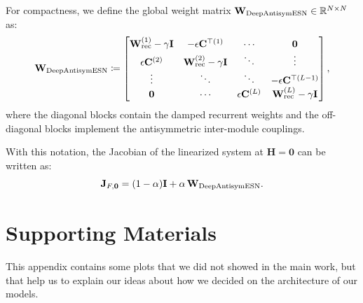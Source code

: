 For compactness, we define the global \DAR\@ weight matrix $\mathbf{W}_{\text{DeepAntisymESN}}\in\mathbb{R}^{N\times N}$ as:
\begin{equation}
\mathbf{W}_{\text{DeepAntisymESN}} \coloneqq
\begin{bmatrix}
\mathbf{W}_{\text{rec}}^{(1)}-\gamma \mathbf{I} & -\epsilon\mathbf{C}^{\top(1)} & \cdots & \mathbf{0} \\
\epsilon\mathbf{C}^{(2)} & \mathbf{W}_{\text{rec}}^{(2)}-\gamma \mathbf{I} & \ddots & \vdots \\
\vdots & \ddots & \ddots & -\epsilon\mathbf{C}^{\top(L-1)} \\
\mathbf{0} & \cdots & \epsilon\mathbf{C}^{(L)} & \mathbf{W}_{\text{rec}}^{(L)}-\gamma \mathbf{I}
\end{bmatrix},
\label{eq:dar-WDAR}
\end{equation}
where the diagonal blocks contain the damped recurrent weights and the off-diagonal blocks implement the antisymmetric inter-module couplings.

With this notation, the Jacobian of the linearized system at $\mathbf{H}=\mathbf{0}$ can be written as:
\begin{equation}
\mathbf{J}_{F,\mathbf{0}} = (1-\alpha)\mathbf{I} + \alpha\,\mathbf{W}_{\text{DeepAntisymESN}}.
\label{eq:dar-J-linearised}
\end{equation}


\chapter{Supporting Materials}
\label{ch:appendix-B}
This appendix contains some plots that we did not showed in the main work, but that help us to explain our ideas about how we decided on the architecture of our models.

